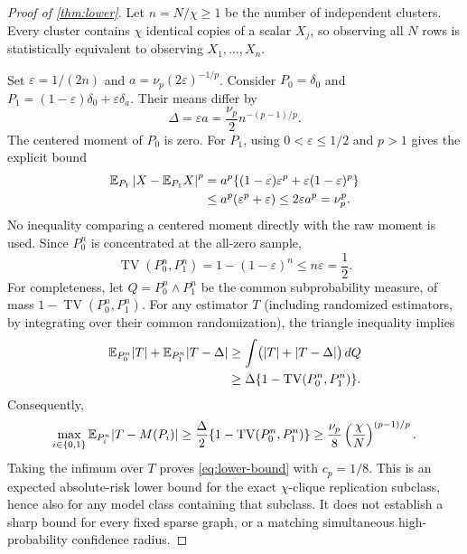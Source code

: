 \begin{proof}[Proof of \cref{thm:lower}]
Let $n=N/\chi\ge1$ be the number of independent clusters. Every cluster contains $\chi$ identical copies of a scalar $X_j$, so observing all $N$ rows is statistically equivalent to observing $X_1,\ldots,X_n$.

Set $\varepsilon=1/(2n)$ and $a=\nu_p(2\varepsilon)^{-1/p}$. Consider $P_0=\delta_0$ and $P_1=(1-\varepsilon)\delta_0+\varepsilon\delta_a$. Their means differ by
\begin{equation}
\Delta=\varepsilon a=\frac{\nu_p}{2}n^{-(p-1)/p}.
\end{equation}
The centered moment of $P_0$ is zero. For $P_1$, using $0<\varepsilon\le1/2$ and $p>1$ gives the explicit bound
\begin{align*}
\mathbb{E}_{P_1}\left|X-\mathbb{E}_{P_1}X\right|^p
&=a^p\{(1-\varepsilon)\varepsilon^p
       +\varepsilon(1-\varepsilon)^p\}\\
&\le a^p(\varepsilon^p+\varepsilon)
 \le2\varepsilon a^p=\nu_p^p.
\end{align*}
No inequality comparing a centered moment directly with the raw moment is used. Since $P_0^n$ is concentrated at the all-zero sample,
\begin{equation}
\operatorname{TV}(P_0^n,P_1^n)=1-(1-\varepsilon)^n\le n\varepsilon=\frac12.
\end{equation}
For completeness, let $Q=P_0^n\wedge P_1^n$ be the common subprobability measure, of mass $1-\operatorname{TV}(P_0^n,P_1^n)$. For any estimator $T$ (including randomized estimators, by integrating over their common randomization), the triangle inequality implies
\begin{align*}
\mathbb{E}_{P_0^n}|T|+\mathbb{E}_{P_1^n}|T-\Delta|
&\ge\int\bigl(|T|+|T-\Delta|\bigr)\,dQ\\
&\ge\Delta\{1-\operatorname{TV}(P_0^n,P_1^n)\}.
\end{align*}
Consequently,
\begin{equation}
\max_{i\in\{0,1\}}\mathbb{E}_{P_i^n}|T-M(P_i)|
\ge\frac{\Delta}{2}\{1-\operatorname{TV}(P_0^n,P_1^n)\}
\ge\frac{\nu_p}{8}\left(\frac{\chi}{N}\right)^{(p-1)/p}.
\end{equation}
Taking the infimum over $T$ proves \cref{eq:lower-bound} with $c_p=1/8$. This is an expected absolute-risk lower bound for the exact $\chi$-clique replication subclass, hence also for any model class containing that subclass. It does not establish a sharp bound for every fixed sparse graph, or a matching simultaneous high-probability confidence radius.
\end{proof}

